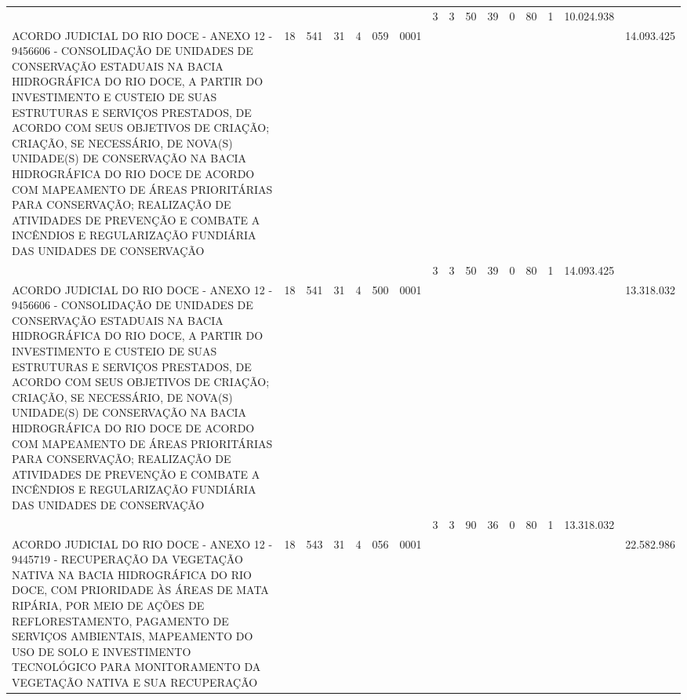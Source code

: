 \documentclass{article}
\begin{document}
\begin{longtable}[c]{m{6.5cm}|m{1pt}m{1pt}m{1pt}m{1pt}m{1pt}m{1pt}|m{1pt}m{1pt}m{0.5pt}m{1pt}|m{1pt}|m{1pt}m{1pt}|m{1pt}|m{2pt}}
& & & & & & & \multicolumn{1}{c}{ 3 } & \multicolumn{1}{c}{ 3 } & \multicolumn{1}{c}{ 50 } & \multicolumn{1}{c|}{ 39 } & \multicolumn{1}{c|}{ 0 } & \multicolumn{1}{l}{ 80 } & \multicolumn{1}{c|}{ 1 } & \multicolumn{1}{r|}{ 10.024.938 } & \\
\multicolumn{1}{L{5.5cm}|}{ ACORDO JUDICIAL DO RIO DOCE - ANEXO 12 - 9456606 - CONSOLIDAÇÃO DE UNIDADES DE CONSERVAÇÃO ESTADUAIS NA BACIA HIDROGRÁFICA DO RIO DOCE, A PARTIR DO INVESTIMENTO E CUSTEIO DE SUAS ESTRUTURAS E SERVIÇOS PRESTADOS, DE ACORDO COM SEUS OBJETIVOS DE CRIAÇÃO; CRIAÇÃO, SE NECESSÁRIO, DE NOVA(S) UNIDADE(S) DE CONSERVAÇÃO NA BACIA HIDROGRÁFICA DO RIO DOCE DE ACORDO COM MAPEAMENTO DE ÁREAS PRIORITÁRIAS PARA CONSERVAÇÃO; REALIZAÇÃO DE ATIVIDADES DE PREVENÇÃO E COMBATE A INCÊNDIOS E REGULARIZAÇÃO FUNDIÁRIA DAS UNIDADES DE CONSERVAÇÃO } & \multicolumn{1}{c}{ 18 } & \multicolumn{1}{c}{ 541 } & \multicolumn{1}{c}{ 31 } & \multicolumn{1}{l}{ 4 } & \multicolumn{1}{c}{ 059 } & \multicolumn{1}{l|}{ 0001 } & & & & & & & & & \multicolumn{1}{r}{ 14.093.425 } \\
& & & & & & & \multicolumn{1}{c}{ 3 } & \multicolumn{1}{c}{ 3 } & \multicolumn{1}{c}{ 50 } & \multicolumn{1}{c|}{ 39 } & \multicolumn{1}{c|}{ 0 } & \multicolumn{1}{l}{ 80 } & \multicolumn{1}{c|}{ 1 } & \multicolumn{1}{r|}{ 14.093.425 } & \\
\multicolumn{1}{L{5.5cm}|}{ ACORDO JUDICIAL DO RIO DOCE - ANEXO 12 - 9456606 - CONSOLIDAÇÃO DE UNIDADES DE CONSERVAÇÃO ESTADUAIS NA BACIA HIDROGRÁFICA DO RIO DOCE, A PARTIR DO INVESTIMENTO E CUSTEIO DE SUAS ESTRUTURAS E SERVIÇOS PRESTADOS, DE ACORDO COM SEUS OBJETIVOS DE CRIAÇÃO; CRIAÇÃO, SE NECESSÁRIO, DE NOVA(S) UNIDADE(S) DE CONSERVAÇÃO NA BACIA HIDROGRÁFICA DO RIO DOCE DE ACORDO COM MAPEAMENTO DE ÁREAS PRIORITÁRIAS PARA CONSERVAÇÃO; REALIZAÇÃO DE ATIVIDADES DE PREVENÇÃO E COMBATE A INCÊNDIOS E REGULARIZAÇÃO FUNDIÁRIA DAS UNIDADES DE CONSERVAÇÃO } & \multicolumn{1}{c}{ 18 } & \multicolumn{1}{c}{ 541 } & \multicolumn{1}{c}{ 31 } & \multicolumn{1}{l}{ 4 } & \multicolumn{1}{c}{ 500 } & \multicolumn{1}{l|}{ 0001 } & & & & & & & & & \multicolumn{1}{r}{ 13.318.032 } \\
& & & & & & & \multicolumn{1}{c}{ 3 } & \multicolumn{1}{c}{ 3 } & \multicolumn{1}{c}{ 90 } & \multicolumn{1}{c|}{ 36 } & \multicolumn{1}{c|}{ 0 } & \multicolumn{1}{l}{ 80 } & \multicolumn{1}{c|}{ 1 } & \multicolumn{1}{r|}{ 13.318.032 } & \\
\multicolumn{1}{L{5.5cm}|}{ ACORDO JUDICIAL DO RIO DOCE - ANEXO 12 - 9445719 - RECUPERAÇÃO DA VEGETAÇÃO NATIVA NA BACIA HIDROGRÁFICA DO RIO DOCE, COM PRIORIDADE ÀS ÁREAS DE MATA RIPÁRIA, POR MEIO DE AÇÕES DE REFLORESTAMENTO, PAGAMENTO DE SERVIÇOS AMBIENTAIS, MAPEAMENTO DO USO DE SOLO E INVESTIMENTO TECNOLÓGICO PARA MONITORAMENTO DA VEGETAÇÃO NATIVA E SUA RECUPERAÇÃO } & \multicolumn{1}{c}{ 18 } & \multicolumn{1}{c}{ 543 } & \multicolumn{1}{c}{ 31 } & \multicolumn{1}{l}{ 4 } & \multicolumn{1}{c}{ 056 } & \multicolumn{1}{l|}{ 0001 } & & & & & & & & & \multicolumn{1}{r}{ 22.582.986 } \\

\end{longtable}
\end{document}
